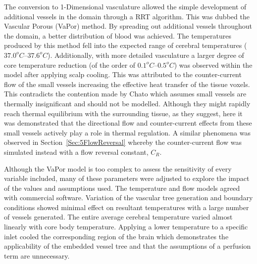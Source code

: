 \documentclass[11pt,english,a4paper,twoside,openright]{report}
\begin{document}
{{{{{{{The conversion to 1-Dimensional vasculature allowed the simple development of additional vessels in the domain through a RRT algorithm. This was dubbed the Vascular Porous (VaPor) method. By spreading out additional vessels throughout the domain, a better distribution of blood was achieved. The temperatures produced by this method fell into the expected range of cerebral temperatures ($37.0^{o}C$--$37.6^{o}C$). Additionally, with more detailed vasculature a larger degree of core temperature reduction (of the order of $0.1^{o}C$--$0.5^{o}C$) was observed within the model after applying scalp cooling. This was attributed to the counter-current flow of the small vessels increasing the effective heat transfer of the tissue voxels. This contradicts the contention made by Chato \cite{chato1980heat} which assumes small vessels are thermally insignificant and should not be modelled. Although they might rapidly reach thermal equilibrium with the surrounding tissue, as they suggest, here it was demonstrated that the directional flow and counter-current effects from these small vessels actively play a role in thermal regulation. A similar phenomena was observed in Section~\ref{Sec:5FlowReversal} whereby the counter-current flow was simulated instead with a flow reversal constant, $C_{R}$.

Although the VaPor model is too complex to assess the sensitivity of every variable included, many of these parameters were adjusted to explore the impact of the values and assumptions used. The temperature and flow models agreed with commercial software. Variation of the vascular tree generation and boundary conditions showed minimal effect on resultant temperatures with a large number of vessels generated. The entire average cerebral temperature varied almost linearly with core body temperature. Applying a lower temperature to a specific inlet cooled the corresponding region of the brain which demonstrates the applicability of the embedded vessel tree and that the assumptions of a perfusion term are unnecessary.

}}}}}}}
\end{document}
